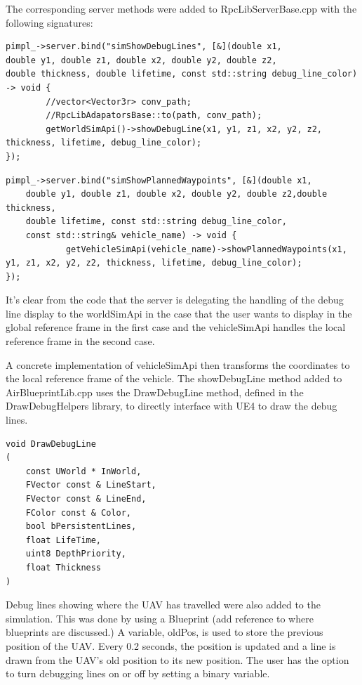 The corresponding server methods were added to RpcLibServerBase.cpp with the following signatures:
\begin{verbatim}
pimpl_->server.bind("simShowDebugLines", [&](double x1,
double y1, double z1, double x2, double y2, double z2,
double thickness, double lifetime, const std::string debug_line_color)
-> void {
		//vector<Vector3r> conv_path;
		//RpcLibAdapatorsBase::to(path, conv_path);
		getWorldSimApi()->showDebugLine(x1, y1, z1, x2, y2, z2, thickness, lifetime, debug_line_color);
});
\end{verbatim}

\begin{verbatim}
pimpl_->server.bind("simShowPlannedWaypoints", [&](double x1, 
    double y1, double z1, double x2, double y2, double z2,double thickness, 
    double lifetime, const std::string debug_line_color,
    const std::string& vehicle_name) -> void {
			getVehicleSimApi(vehicle_name)->showPlannedWaypoints(x1, y1, z1, x2, y2, z2, thickness, lifetime, debug_line_color);
});
\end{verbatim}

It's clear from the code that the server is delegating the handling of the debug line display to the worldSimApi in the case that the user wants to display in the global reference frame in the first case and the vehicleSimApi handles the local reference frame in the second case. 

A concrete implementation of vehicleSimApi then transforms the coordinates to the local reference frame of the vehicle. The showDebugLine method added to AirBlueprintLib.cpp uses the DrawDebugLine method, defined in the DrawDebugHelpers library, to directly interface with UE4 to draw the debug lines.

\begin{verbatim}
void DrawDebugLine
(
    const UWorld * InWorld,
    FVector const & LineStart,
    FVector const & LineEnd,
    FColor const & Color,
    bool bPersistentLines,
    float LifeTime,
    uint8 DepthPriority,
    float Thickness
)
\end{verbatim}
\par


Debug lines showing where the UAV has travelled were also added to the simulation. This was done by using a Blueprint (add reference to where blueprints are discussed.) A variable, oldPos, is used to store the previous position of the UAV. Every 0.2 seconds, the position is updated and a line is drawn from the UAV's old position to its new position. The user has the option to turn debugging lines on or off by setting a binary variable.


